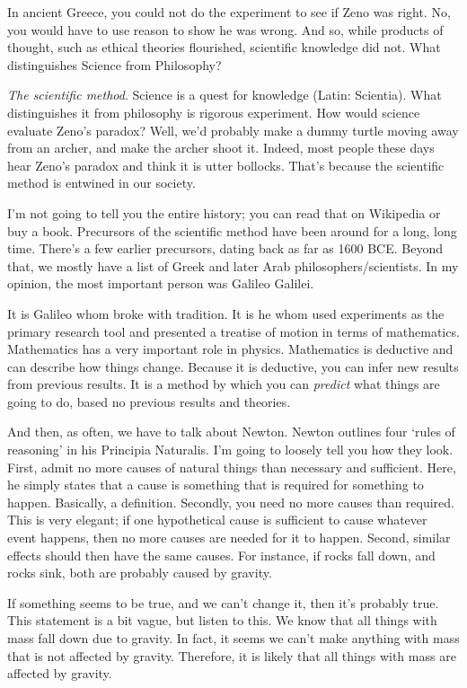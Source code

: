 \begin{multicols}{2}
In ancient Greece, you could not do the experiment to see if Zeno was right. No, you would have to use reason to show he was wrong. And so, while products of thought, such as ethical theories flourished, scientific knowledge did not. What distinguishes Science from Philosophy?

\emph{The scientific method}. Science is a quest for knowledge (Latin: Scientia). What distinguishes it from philosophy is rigorous experiment. How would science evaluate Zeno's paradox? Well, we'd probably make a dummy turtle moving away from an archer, and make the archer shoot it. Indeed, most people these days hear Zeno's paradox and think it is utter bollocks. That's because the scientific method is entwined in our society.

I'm not going to tell you the entire history; you can read that on Wikipedia\cite{historyscientificmethod} or buy a book. Precursors of the scientific method have been around for a long, long time. There's a few earlier precursors, dating back as far as 1600 BCE. Beyond that, we mostly have a list of Greek and later Arab philosophers/scientists. In my opinion, the most important person was Galileo Galilei.

It is Galileo whom broke with tradition. It is he whom used experiments as the primary research tool and presented a treatise of motion in terms of mathematics. Mathematics has a very important role in physics. Mathematics is deductive and can describe how things change. Because it is deductive, you can infer new results from previous results. It is a method by which you can \emph{predict} what things are going to do, based no previous results and theories.

And then, as often, we have to talk about Newton. Newton outlines four ‘rules of reasoning’ in his Principia Naturalis. I'm going to loosely tell you how they look. First, admit no more causes of natural things than necessary and sufficient. Here, he simply states that a cause is something that is required for something to happen. Basically, a definition. Secondly, you need no more causes than required. This is very elegant; if one hypothetical cause is sufficient to cause whatever event happens, then no more causes are needed for it to happen. Second, similar effects should then have the same causes. For instance, if rocks fall down, and rocks sink, both are probably caused by gravity.

If something seems to be true, and we can't change it, then it's probably true. This statement is a bit vague, but listen to this. We know that all things with mass fall down due to gravity. In fact, it seems we can't make anything with mass that is not affected by gravity. Therefore, it is likely that all things with mass are affected by gravity.


\end{multicols}
